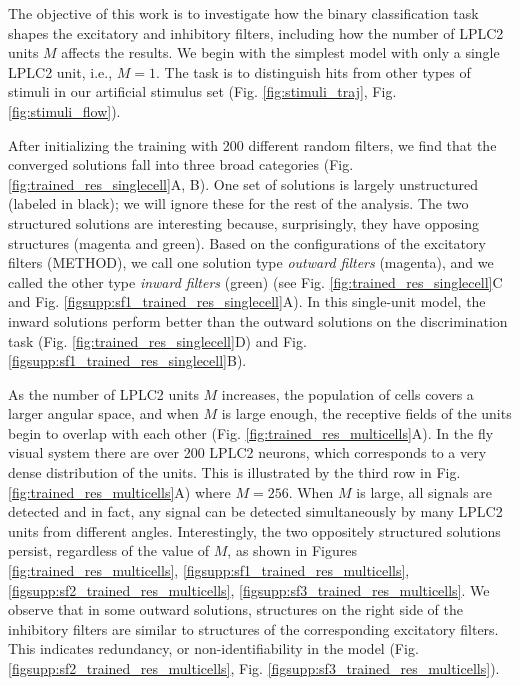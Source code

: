 \documentclass[pdftex,9pt,lineno]{elife}
\begin{document}
The objective of this work is to investigate how the binary classification task shapes the excitatory and inhibitory filters, including how the number of LPLC2 units $M$ affects the results. We begin with the simplest model with only a single LPLC2 unit, i.e., $M=1$. The task is to distinguish hits from other types of stimuli in our artificial stimulus set (Fig. \ref{fig:stimuli_traj}, Fig. \ref{fig:stimuli_flow}).

After initializing the training with 200 different random filters, we find that the converged solutions fall into three broad categories (Fig. \ref{fig:trained_res_singlecell}A, B). One set of solutions is largely unstructured (labeled in black); we will ignore these for the rest of the analysis. The two structured solutions are interesting because, surprisingly, they have  opposing structures (magenta and green). Based on the configurations of the excitatory filters (METHOD), we call one solution type \textit{outward filters}   (magenta), and we called the other type \textit{inward filters} (green) (see Fig. \ref{fig:trained_res_singlecell}C and Fig. \ref{figsupp:sf1_trained_res_singlecell}A). In this single-unit model, the inward solutions perform better than the outward solutions on the discrimination task (Fig. \ref{fig:trained_res_singlecell}D) and Fig. \ref{figsupp:sf1_trained_res_singlecell}B).


As the number of LPLC2 units $M$ increases, the population of cells covers a larger angular space, and when $M$ is large enough, the receptive fields of the units begin to overlap with each other (Fig. \ref{fig:trained_res_multicells}A). In the fly visual system there are over 200 LPLC2 neurons, which corresponds to a very dense distribution of the units. This is illustrated by the third row in Fig. \ref{fig:trained_res_multicells}A) where $M=256$. When $M$ is large, all signals are detected and in fact, any signal can be detected simultaneously by many LPLC2 units from different angles. Interestingly, the two oppositely structured solutions persist, regardless of the value of $M$, as shown in Figures \ref{fig:trained_res_multicells},  \ref{figsupp:sf1_trained_res_multicells}, \ref{figsupp:sf2_trained_res_multicells},  \ref{figsupp:sf3_trained_res_multicells}. We observe that in some outward solutions, structures on the right side of the inhibitory filters are similar to structures of the corresponding excitatory filters. This indicates redundancy, or non-identifiability in the model (Fig. \ref{figsupp:sf2_trained_res_multicells}, Fig. \ref{figsupp:sf3_trained_res_multicells}).
\end{document}
